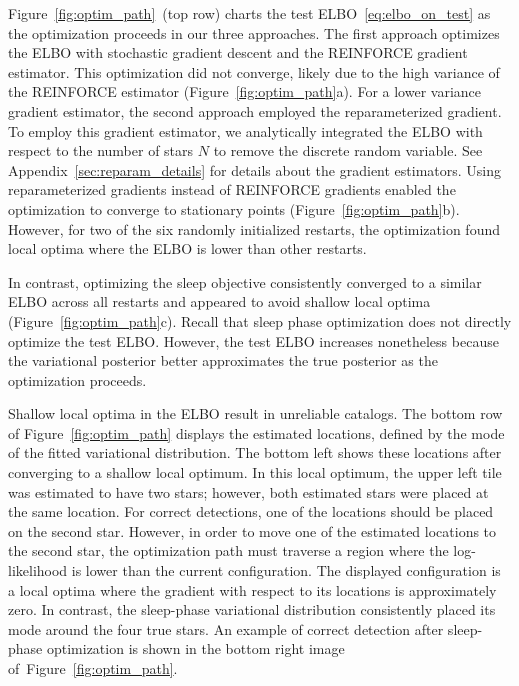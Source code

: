 Figure~\ref{fig:optim_path}~(top row) charts the test ELBO~\eqref{eq:elbo_on_test} as the optimization proceeds in our three approaches.
The first approach optimizes the ELBO with stochastic gradient descent and the REINFORCE gradient estimator.
This optimization did not converge, likely due to the high variance of the REINFORCE estimator (Figure~\ref{fig:optim_path}a). 
For a lower variance gradient estimator, the second approach employed the reparameterized gradient. To employ this gradient estimator, we analytically integrated the ELBO with respect to the number of stars $N$ to remove the discrete random variable. 
See Appendix~\ref{sec:reparam_details} for details about the gradient estimators. 
Using reparameterized gradients instead of REINFORCE gradients enabled the optimization to converge to stationary points (Figure~\ref{fig:optim_path}b). 
However, for two of the six randomly initialized restarts, 
the optimization found local optima where the ELBO is lower than other restarts. 

In contrast, optimizing the sleep objective consistently converged to a similar ELBO across all restarts and appeared to avoid shallow local optima (Figure~\ref{fig:optim_path}c).
Recall that sleep phase optimization does not directly optimize the test ELBO. However, the test ELBO increases nonetheless because the variational posterior better approximates the true posterior as the optimization proceeds. 

Shallow local optima in the ELBO result in unreliable catalogs. 
The bottom row of Figure~\ref{fig:optim_path} displays the estimated locations, defined by the mode of the fitted variational distribution. 
The bottom left shows these locations after converging to a shallow local optimum. 
In this local optimum, the upper left tile was estimated to have two stars; however, both estimated stars were placed at the same location.
For correct detections, one of the locations should be placed on the second star.
However, in order to move one of the estimated locations to the second star, the optimization path must traverse a region where the log-likelihood is lower than the current configuration. 
The displayed configuration is a local optima where the gradient with respect to its locations is approximately zero.
In contrast, the sleep-phase variational distribution consistently placed its mode around the four true stars. 
An example of correct detection after sleep-phase optimization is shown in the bottom right image of~Figure~\ref{fig:optim_path}.


